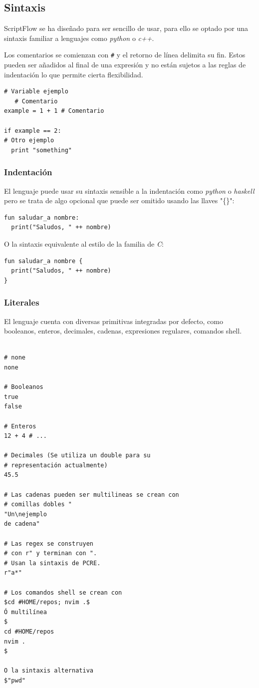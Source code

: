 \documentclass[11pt]{article}
\begin{document}
\subsection{Sintaxis}
\label{sec:org5021479}

ScriptFlow se ha diseñado para ser sencillo de usar, para ello se optado por una sintaxis familiar a lenguajes como
\emph{python} o \emph{c++}.

Los comentarios se comienzan con \texttt{\#} y el retorno de línea delimita su fin. Estos pueden ser añadidos al final de una expresión y no están sujetos a las reglas de indentación
lo que permite cierta flexibilidad.

\begin{verbatim}
# Variable ejemplo
   # Comentario
example = 1 + 1 # Comentario

if example == 2:
# Otro ejemplo
  print "something"
\end{verbatim}

\subsubsection{Indentación}
\label{sec:orgee38e8a}

\label{orgcb051b3}
El lenguaje puede usar su sintaxis sensible a la indentación como \emph{python} o \emph{haskell} pero se trata de algo opcional que puede ser omitido usando las llaves "\{\}":

\begin{verbatim}
fun saludar_a nombre:
  print("Saludos, " ++ nombre)
\end{verbatim}

O la sintaxis equivalente al estilo de la familia de \emph{C}:
\begin{verbatim}
fun saludar_a nombre {
  print("Saludos, " ++ nombre)
}
\end{verbatim}

\subsubsection{Literales}
\label{sec:orgd2238c1}

El lenguaje cuenta con diversas primitivas integradas por defecto, como
booleanos, enteros, decimales, cadenas, expresiones regulares, comandos
shell.

\begin{verbatim}

# none
none

# Booleanos
true
false

# Enteros
12 + 4 # ...

# Decimales (Se utiliza un double para su
# representación actualmente)
45.5

# Las cadenas pueden ser multilineas se crean con
# comillas dobles "
"Un\nejemplo
de cadena"

# Las regex se construyen
# con r" y terminan con ".
# Usan la sintaxis de PCRE.
r"a*"

# Los comandos shell se crean con
$cd #HOME/repos; nvim .$
Ó multilínea
$
cd #HOME/repos
nvim .
$

O la sintaxis alternativa
$"pwd"
\end{verbatim}
\end{document}
